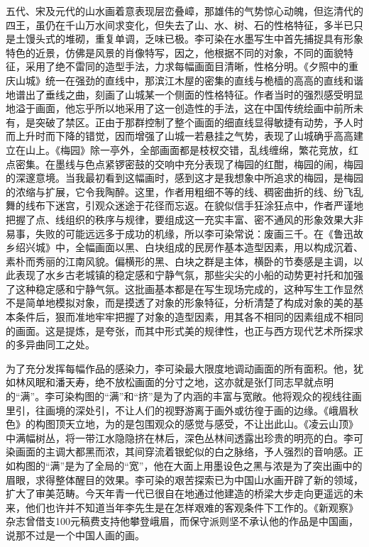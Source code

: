 \documentclass{article}
\begin{document}
五代、宋及元代的山水画着意表现层峦叠嶂，那雄伟的气势惊心动魄，但迄清代的四王，虽仍在千山万水间求变化，但失去了山、水、树、石的性格特征，多半已只是土馒头式的堆砌，重复单调，乏味已极。李可染在水墨写生中首先捕捉具有形象特色的近景，仿佛是风景的肖像特写，因之，他根据不同的对象，不同的面貌特征，采用了绝不雷同的造型手法，力求每幅画面目清晰，性格分明。《夕照中的重庆山城》统一在强劲的直线中，那滨江木屋的密集的直线与桅樯的高高的直线和谐地谱出了垂线之曲，刻画了山城某一个侧面的性格特征。作者当时的强烈感受明显地溢于画面，他忘乎所以地采用了这一创造性的手法，这在中国传统绘画中前所未有，是突破了禁区。正由于那群控制了整个画面的细直线显得敏捷有动势，予人时而上升时而下降的错觉，因而增强了山城一若悬挂之气势，表现了山城确乎高高建立在山上。《梅园》除一亭外，全部画面都是枝杈交错，乱线缠绵，繁花竞放，红点密集。在墨线与色点紧锣密鼓的交响中充分表现了梅园的红酣，梅园的闹，梅园的深邃意境。当我最初看到这幅画时，感到这才是我想象中所追求的梅园，是梅园的浓缩与扩展，它令我陶醉。这里，作者用粗细不等的线、稠密曲折的线、纷飞乱舞的线布下迷宫，引观众迷途于花径而忘返。在貌似信手狂涂狂点中，作者严谨地把握了点、线组织的秩序与规律，要组成这一充实丰富、密不通风的形象效果大非易事，失败的可能远远多于成功的机缘，所以李可染常说：废画三千。在《鲁迅故乡绍兴城》中，全幅画面以黑、白块组成的民房作基本造型因素，用以构成沉着、素朴而秀丽的江南风貌。偏横形的黑、白块之群是主体，横卧的节奏感是主调，以此表现了水乡古老城镇的稳定感和宁静气氛，那些尖尖的小船的动势更衬托和加强了这种稳定感和宁静气氛。这批画基本都是在写生现场完成的，这种写生工作显然不是简单地模拟对象，而是摸透了对象的形象特征，分析清楚了构成对象的美的基本条件后，狠而准地牢牢把握了对象的造型因素，用其各不相同的因素组成不相同的画面。这是提炼，是夸张，而其中形式美的规律性，也正与西方现代艺术所探求的多异曲同工之处。

为了充分发挥每幅作品的感染力，李可染最大限度地调动画面的所有面积。他，犹如林风眠和潘天寿，绝不放松画面的分寸之地，这亦就是张仃同志早就点明的“满”。李可染构图的“满”和“挤”是为了内涵的丰富与宽敞。他将观众的视线往画里引，往画境的深处引，不让人们的视野游离于画外或彷徨于画的边缘。《峨眉秋色》的构图顶天立地，为的是包围观众的感觉与感受，不让出此山。《凌云山顶》中满幅树丛，将一带江水隐隐挤在林后，深色丛林间透露出珍贵的明亮的白。李可染画面的主调大都黑而浓，其间穿流着银蛇似的白之脉络，予人强烈的音响感。正如构图的“满”是为了全局的“宽”，他在大面上用墨设色之黑与浓是为了突出画中的眉眼，求得整体醒目的效果。李可染的艰苦探索已为中国山水画开辟了新的领域，扩大了审美范畴。今天年青一代已很自在地通过他建造的桥梁大步走向更遥远的未来，他们也许并不知道当年李先生是在怎样艰难的客观条件下工作的。《新观察》杂志曾借支100元稿费支持他攀登峨眉，而保守派则坚不承认他的作品是中国画，说那不过是一个中国人画的画。
\end{document}
